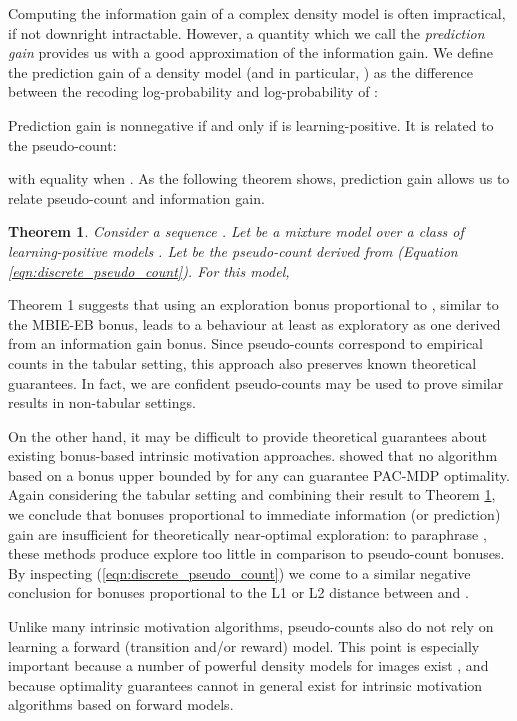 \documentclass{article}
\newtheorem{thm}{Theorem}
\begin{document}
Computing the information gain of a complex density model is often impractical, if not downright intractable. However, a quantity which we call the \emph{prediction gain} provides us with a good approximation of the information gain. We define the prediction gain of a density model  (and in particular, ) as the difference between the recoding log-probability and log-probability of :

Prediction gain is nonnegative if and only if  is learning-positive. It is related to the pseudo-count:

with equality when . As the following theorem shows, prediction gain allows us to relate pseudo-count and information gain.
\begin{thm}\label{thm:main_result}
Consider a sequence . Let  be a mixture model over a class of learning-positive models . Let  be the pseudo-count derived from  (Equation \ref{eqn:discrete_pseudo_count}). For this model,

\end{thm}
Theorem 1 suggests that using an exploration bonus proportional to , similar to the MBIE-EB bonus, leads to a behaviour at least as exploratory as one derived from an information gain bonus. Since pseudo-counts correspond to empirical counts in the tabular setting, this approach also preserves known theoretical guarantees. In fact, we are confident pseudo-counts may be used to prove similar results in non-tabular settings.

On the other hand, it may be difficult to provide theoretical guarantees about existing bonus-based intrinsic motivation approaches.
\citet{kolter09near} showed that no algorithm based on a bonus upper bounded by  for any  can guarantee PAC-MDP optimality. Again considering the tabular setting and combining their result to Theorem \ref{thm:main_result}, we conclude that bonuses proportional to immediate information (or prediction) gain are insufficient for theoretically near-optimal exploration: to paraphrase \citeauthor{kolter09near}, these methods produce explore too little in comparison to pseudo-count bonuses. By inspecting (\ref{eqn:discrete_pseudo_count}) we come to a similar negative conclusion for bonuses proportional to the L1 or L2 distance between  and .

Unlike many intrinsic motivation algorithms, pseudo-counts also do not rely on learning a forward (transition and/or reward) model. This point is especially important because a number of powerful density models for images exist \citep{vandenoord16pixel}, and because optimality guarantees cannot in general exist for intrinsic motivation algorithms based on forward models.
\end{document}
